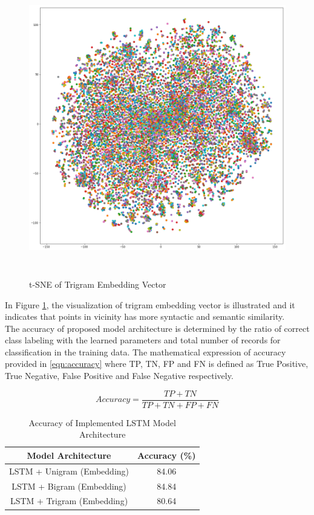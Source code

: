 \documentclass[a4paper]{article}
\begin{document}
\begin{figure}[t!]
	\centering
	\includegraphics[width = 0.95\columnwidth, height = 13cm]{tsne.png}
	\caption{t-SNE of Trigram Embedding Vector}
	\label{fig:tsne}
\end{figure}

In Figure \ref{fig:tsne}, the visualization of trigram embedding vector is illustrated and it indicates that points in vicinity has more syntactic and semantic similarity.
\\

The accuracy of proposed model architecture is determined by the ratio of correct class labeling with the learned parameters and total number of records for classification in the training data. The mathematical expression of accuracy provided in \ref{eqn:accuracy} where TP, TN, FP and FN is defined as True Positive, True Negative, False Positive and False Negative respectively.

\begin{equation}
\label{eqn:accuracy}
Accuracy = \frac{TP + TN}{TP + TN + FP + FN}
\end{equation}

\begin{table}[t!]
	\centering
	\caption{Accuracy of Implemented LSTM Model Architecture}
	\label{table:acc}
	\begin{tabular}{|c|c|}
		\hline
		\textbf{Model Architecture} & \textbf{Accuracy (\%)} \\ \hline
		LSTM + Unigram (Embedding)  & 84.06                   \\ \hline
		LSTM + Bigram (Embedding)   & 84.84                  \\ \hline
		LSTM + Trigram (Embedding)  & 80.64                  \\ \hline
	\end{tabular}
\end{table}
\end{document}
